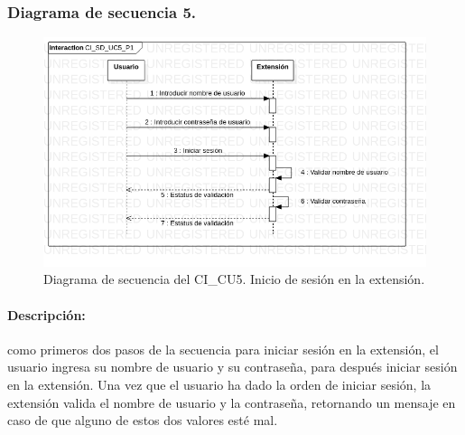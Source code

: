 \documentclass[12pt, a4paper, titlepage]{report}
\begin{document}
              	\subsubsection{Diagrama de secuencia 5.}
        		    \begin{figure}[H]
        				\begin{center}    		    	\includegraphics[width=15cm]{./imagenes/Disenio/Componente_1/CI_SD_UC5_P1.png}
        				\caption[Diagrama de secuencia 5 del Componente I]{Diagrama de secuencia del CI\_CU5. Inicio de sesión en la extensión.}
        				\end{center}
        			\end{figure}
        			
        		    \paragraph{Descripción:}
        		    como primeros dos pasos de la secuencia para iniciar sesión en la extensión, el usuario ingresa su nombre de usuario y su contraseña, para después iniciar sesión en la extensión. Una vez que el usuario ha dado la orden de iniciar sesión, la extensión valida el nombre de usuario y la contraseña, retornando un mensaje en caso de que alguno de estos dos valores esté mal. 
    			
    			
\end{document}
